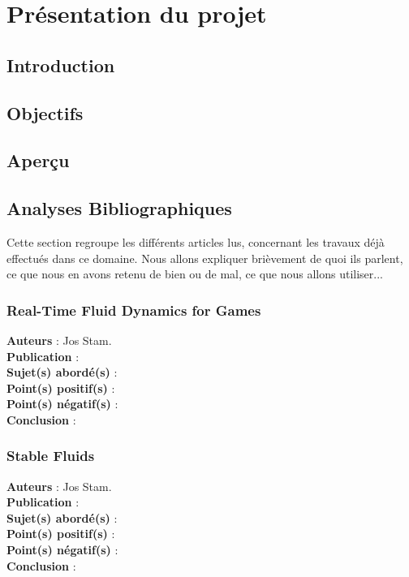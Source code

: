 \documentclass[a4paper,10pt]{article}
\begin{document}
\newpage

\tableofcontents

\newpage



\section{Présentation du projet}
\subsection{Introduction}

\subsection{Objectifs}


\subsection{Aperçu}


\subsection{Analyses Bibliographiques}
Cette section regroupe les différents articles lus, concernant les travaux déjà effectués dans ce domaine. 
Nous allons expliquer brièvement de quoi ils parlent, ce que nous en avons retenu de bien ou de mal, ce que nous allons 
utiliser...

\subsubsection{Real-Time Fluid Dynamics for Games}
\textbf{Auteurs} : Jos Stam.\\
\textbf{Publication} : \\
\textbf{Sujet(s) abordé(s)} : \\
\textbf{Point(s) positif(s)} :\\
\textbf{Point(s) négatif(s)} :\\
\textbf{Conclusion} :\\

\subsubsection{Stable Fluids}
\textbf{Auteurs} : Jos Stam.\\
\textbf{Publication} :\\
\textbf{Sujet(s) abordé(s)} : \\
\textbf{Point(s) positif(s)} :\\
\textbf{Point(s) négatif(s)} :\\
\textbf{Conclusion} :\\
\end{document}
